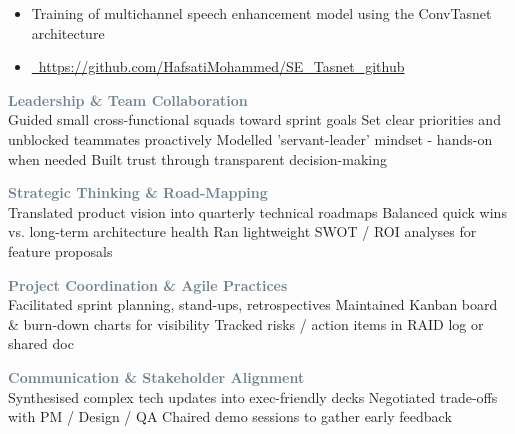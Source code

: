 \documentclass[9pt,a4paper,ragged2e]{altacv}
\begin{document}
\begin{paracol}{2}
\vspace{4pt}
\begin{itemize}
  \item Training of multichannel speech enhancement model using the ConvTasnet architecture
  \item \href{https://github.com/HafsatiMohammed/SE_Tasnet_github}{\faExternalLink\ https://github.com/HafsatiMohammed/SE\_Tasnet\_github}
\end{itemize}

\switchcolumn
{}
\textcolor{SlateGrey}{\textbf{Leadership \& Team Collaboration}}\\
Guided small cross-functional squads toward sprint goals \textbar{} Set clear priorities and unblocked teammates proactively \textbar{} Modelled 'servant-leader' mindset - hands-on when needed \textbar{} Built trust through transparent decision-making

\vspace{1pt}

\textcolor{SlateGrey}{\textbf{Strategic Thinking \& Road-Mapping}}\\
Translated product vision into quarterly technical roadmaps \textbar{} Balanced quick wins vs. long-term architecture health \textbar{} Ran lightweight SWOT / ROI analyses for feature proposals

\vspace{1pt}

\textcolor{SlateGrey}{\textbf{Project Coordination \& Agile Practices}}\\
Facilitated sprint planning, stand-ups, retrospectives \textbar{} Maintained Kanban board \& burn-down charts for visibility \textbar{} Tracked risks / action items in RAID log or shared doc

\vspace{1pt}

\textcolor{SlateGrey}{\textbf{Communication \& Stakeholder Alignment}}\\
Synthesised complex tech updates into exec-friendly decks \textbar{} Negotiated trade-offs with PM / Design / QA \textbar{} Chaired demo sessions to gather early feedback

\vspace{1pt}


\end{paracol}
\end{document}
